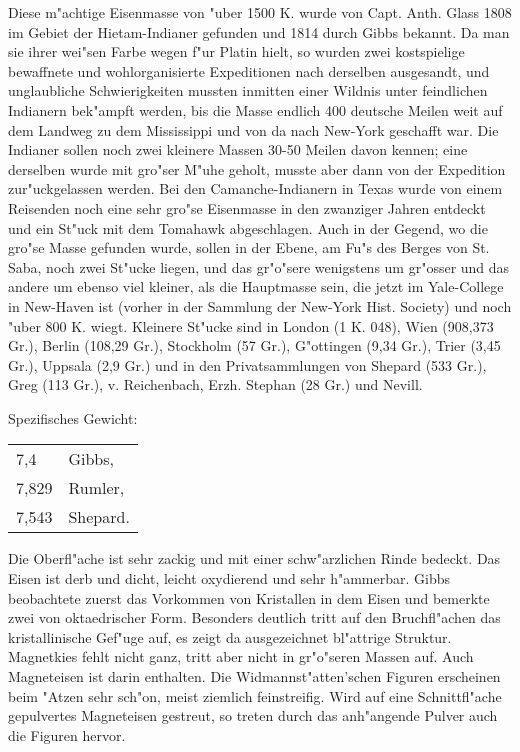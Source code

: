 \documentclass[a4paper, 11pt, oneside]{article}
\begin{document}
Diese m"achtige Eisenmasse von "uber 1500 K. wurde von Capt. Anth. Glass 1808 im Gebiet der Hietam-Indianer gefunden und 1814 durch Gibbs bekannt. Da man sie ihrer wei"sen Farbe wegen f"ur Platin hielt, so wurden zwei kostspielige bewaffnete und wohlorganisierte Expeditionen nach derselben ausgesandt, und unglaubliche Schwierigkeiten mussten inmitten einer Wildnis unter feindlichen Indianern bek"ampft werden, bis die Masse endlich 400 deutsche Meilen weit auf dem Landweg zu dem Mississippi und von da nach New-York geschafft war. Die Indianer sollen noch zwei kleinere Massen 30-50 Meilen davon kennen; eine derselben wurde mit gro"ser M"uhe geholt, musste aber dann von der Expedition zur"uckgelassen werden. Bei den Camanche-Indianern in Texas wurde von einem Reisenden noch eine sehr gro"se Eisenmasse in den zwanziger Jahren entdeckt und ein St"uck mit dem Tomahawk abgeschlagen. Auch in der Gegend, wo die gro"se Masse gefunden wurde, sollen in der Ebene, am Fu"s des Berges von St. Saba, noch zwei St"ucke liegen, und das gr"o"sere wenigstens um gr"osser und das andere um ebenso viel kleiner, als die Hauptmasse sein, die jetzt im Yale-College in New-Haven ist (vorher in der Sammlung der New-York Hist. Society) und noch "uber 800 K. wiegt. Kleinere St"ucke sind in London (1 K. 048), Wien (908,373 Gr.), Berlin (108,29 Gr.), Stockholm (57 Gr.), G"ottingen (9,34 Gr.), Trier (3,45 Gr.), Uppsala (2,9 Gr.) und in den Privatsammlungen von Shepard (533 Gr.), Greg (113 Gr.), v. Reichenbach, Erzh. Stephan (28 Gr.) und Nevill.

Spezifisches Gewicht:  
\begin{table}[!ht]
    \centering
    \begin{tabular}{l l}
        7,4 & Gibbs,\\
        7,829 & Rumler,\\
        7,543 & Shepard.
    \end{tabular}
\end{table}

Die Oberfl"ache ist sehr zackig und mit einer schw"arzlichen Rinde bedeckt. Das Eisen ist derb und dicht, leicht oxydierend und sehr h"ammerbar. Gibbs beobachtete zuerst das Vorkommen von Kristallen in dem Eisen und bemerkte zwei von oktaedrischer Form. Besonders deutlich tritt auf den Bruchfl"achen das kristallinische Gef"uge auf, es zeigt da ausgezeichnet bl"attrige Struktur. Magnetkies fehlt nicht ganz, tritt aber nicht in gr"o"seren Massen auf. Auch Magneteisen ist darin enthalten. Die Widmannst"atten'schen Figuren erscheinen beim "Atzen sehr sch"on, meist ziemlich feinstreifig. Wird auf eine Schnittfl"ache gepulvertes Magneteisen gestreut, so treten durch das anh"angende Pulver auch die Figuren hervor.
\end{document}
